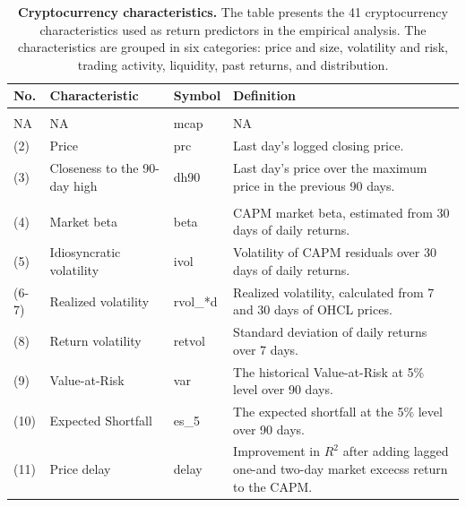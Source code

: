 \documentclass[
  12pt,
  a4paper,
  openany]{scrbook}
\begin{document}
\begin{table}
\centering
\caption[Cryptocurrency characteristics.]{\label{tab:unnamed-chunk-1}\textbf{Cryptocurrency characteristics.} The table presents the 41 cryptocurrency characteristics used as return predictors in the empirical analysis. The characteristics are grouped in six categories: price and size, volatility and risk, trading activity, liquidity, past returns, and distribution. \label{tbl-characteristics}}
\centering
\fontsize{8}{10}\selectfont
\begin{tabular}[t]{l>{\raggedright\arraybackslash}p{10em}l>{\raggedright\arraybackslash}p{27em}}
\toprule
No. & Characteristic & Symbol & Definition\\
\midrule
\addlinespace[0.3em]
\multicolumn{4}{l}{\textbf{Panel A: Price \& size}}\\
\hspace{1em}NA & NA & mcap & NA\\
\hspace{1em}(2) & Price & prc & Last day's logged closing price.\\
\hspace{1em}(3) & Closeness to the 90-day high & dh90 & Last day's price over the maximum price in the previous 90 days.\\
\addlinespace[0.3em]
\multicolumn{4}{l}{\textbf{Panel B: Volatility \& risk}}\\
\hspace{1em}(4) & Market beta & beta & CAPM market beta, estimated from 30 days of daily returns.\\
\hspace{1em}(5) & Idiosyncratic volatility & ivol & Volatility of CAPM residuals over 30 days of daily returns.\\
\hspace{1em}(6-7) & Realized volatility & rvol\_*d & Realized volatility, calculated from 7 and 30 days of OHCL prices.\\
\hspace{1em}(8) & Return volatility & retvol & Standard deviation of daily returns over 7 days.\\
\hspace{1em}(9) & Value-at-Risk & var & The historical Value-at-Risk at 5\% level over 90 days.\\
\hspace{1em}(10) & Expected Shortfall & es\_5 & The expected shortfall at the 5\% level over 90 days.\\
\hspace{1em}(11) & Price delay & delay & Improvement in \(R^2\) after adding lagged one-and two-day market excecss return to the CAPM.\\

\end{tabular}
\end{table}
\end{document}
